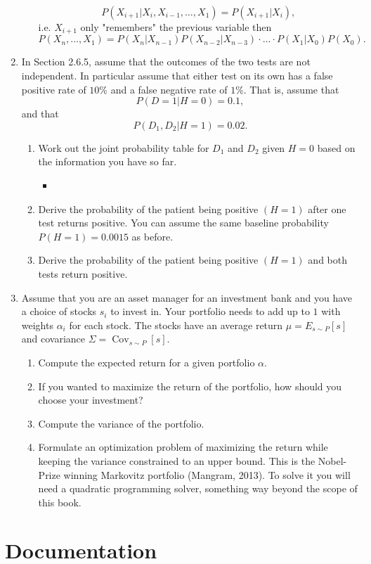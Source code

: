 \documentclass{article}
\begin{document}
\begin{enumerate}
\begin{itemize}
			$$
			P(X_{i + 1} | X_i, X_{i - 1}, \dots, X_1) = P(X_{i + 1}| X_i),
			$$
			i.e. $X_{i + 1}$ only "remembers" the previous variable then
			$$
			P(X_n, \dots, X_1) = P(X_n|X_{n - 1})P(X_{n - 2}|X_{n - 3})\cdot \dots \cdot P(X_1|X_0)P(X_0).
			$$
		\end{itemize}
	\item In Section 2.6.5, assume that the outcomes of the two tests are not independent. In particular assume that either test on its own has a false positive rate of $10\%$ and a false negative rate of $1\%$. That is, assume that
	$$
	P(D = 1 | H = 0) = 0.1,
	$$
	and that
	$$
	P(D_1, D_2 | H = 1) = 0.02.
	$$
	\begin{enumerate}
		\item Work out the joint probability table for $D_1$ and $D_2$ given $H = 0$ based on the information you have so far.
			\begin{itemize}
				\item 
			\end{itemize}
		\item Derive the probability of the patient being positive $(H = 1)$ after one test returns positive. You can assume the same baseline probability $P(H = 1) = 0.0015$ as before.
		\item Derive the probability of the patient being positive $(H = 1)$ and both tests return positive.
	\end{enumerate}
	\item Assume that you are an asset manager for an investment bank and you have a choice of stocks $s_i$ to invest in. Your portfolio needs to add up to $1$ with weights $\alpha_i$ for each stock. The stocks have an average return $\mu = E_{s \sim P}[s]$ and covariance $\Sigma = \operatorname{Cov}_{s \sim P}[s]$.
		\begin{enumerate}
			\item Compute the expected return for a given portfolio $\alpha$.
			\item If you wanted to maximize the return of the portfolio, how should you choose your investment?
			\item Compute the variance of the portfolio.
			\item Formulate an optimization problem of maximizing the return while keeping the variance constrained to an upper bound. This is the Nobel-Prize winning Markovitz portfolio (Mangram, 2013). To solve it you will need a quadratic programming solver, something way beyond the scope of this book.
		\end{enumerate}
\end{enumerate}

\section{Documentation}
\end{document}
